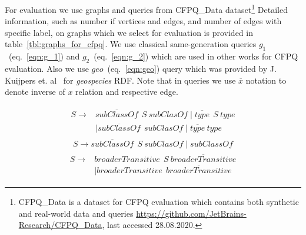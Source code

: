 For evaluation we use graphs and queries from CFPQ\_Data dataset\footnote{CFPQ\_Data is a dataset for CFPQ evaluation which contains both synthetic and real-world data and queries \url{https://github.com/JetBrains-Research/CFPQ\_Data}, last accessed 28.08.2020.}
Detailed information, such as number if vertices and edges, and number of edges with specific label, on graphs which we select for evaluation is provided in table~\ref{tbl:graphs_for_cfpq}.
We use classical same-generation queries $g_1$~(eq.~\ref{eqn:g_1}) and $g_2$~(eq.~\ref{eqn:g_2}) which are used in other works for CFPQ evaluation.
Also we use $geo$~(eq.~\ref{eqn:geo}) query which was provided by J. Kuijpers et. al~\cite{Kuijpers:2019:ESC:3335783.3335791} for \textit{geospecies} RDF.
Note that in queries we use $\overline{x}$ notation to denote inverse of $x$ relation and respective edge.

\begin{align}
\begin{split}
\label{eqn:g_1}
S \to & \overline{\textit{subClassOf}} \ \ S \ \textit{subClasOf} \mid \overline{\textit{type}} \ \ S \ \textit{type}\\   & \mid \overline{\textit{subClassOf}} \ \ \textit{subClasOf} \mid \overline{\textit{type}} \ \textit{type}
\end{split}
\end{align}
\begin{align}
\label{eqn:g_2}
S \to \overline{\textit{subClassOf}} \ \ S \ \textit{subClasOf} \mid \textit{subClassOf}
\end{align}
\begin{align}
\begin{split}
\label{eqn:geo}
S \to & \textit{broaderTransitive} \ \  S \ \overline{\textit{broaderTransitive}} \\
      & \mid \textit{broaderTransitive} \ \  \overline{\textit{broaderTransitive}}
\end{split}
\end{align}

